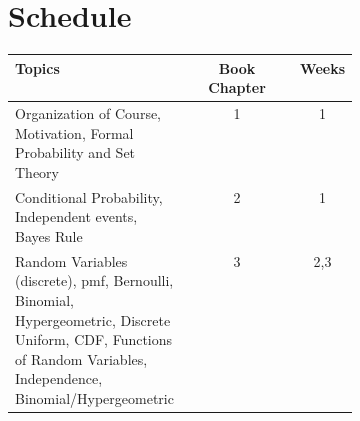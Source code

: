 \documentclass[12pt]{article}
\begin{document}
\section{Schedule}
\begin{tabular}{|p{0.4\linewidth}|c|c|}
\hline
Topics & Book Chapter & Weeks\\
\hline
Organization of Course, Motivation, Formal Probability and Set Theory & 1 & 1\\
\hline
Conditional Probability, Independent events, Bayes Rule& 2&1\\
\hline
Random Variables (discrete), pmf, Bernoulli, Binomial, Hypergeometric, Discrete Uniform, CDF, Functions of Random Variables, Independence, Binomial/Hypergeometric & 3 & 2,3\\
\end{tabular}
\end{document}
